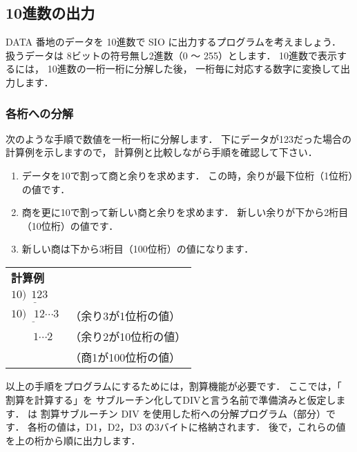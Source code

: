 \subsection{10進数の出力}

DATA 番地のデータを 10進数で SIO に出力するプログラムを考えましょう．
扱うデータは 8ビットの符号無し2進数（0 〜 255）とします．
10進数で表示するには， 
10進数の一桁一桁に分解した後，
一桁毎に対応する数字に変換して出力します．

\subsubsection{各桁への分解}
次のような手順で数値を一桁一桁に分解します．
下にデータが123だった場合の計算例を示しますので，
計算例と比較しながら手順を確認して下さい．

\begin{enumerate}
\item データを10で割って商と余りを求めます．
この時，余りが最下位桁（1位桁）の値です．

\item 商を更に10で割って新しい商と余りを求めます．
新しい余りが下から2桁目（10位桁）の値です．

\item 新しい商は下から3桁目（100位桁）の値になります．
\end{enumerate}

\begin{center}
\begin{tabular}{l l}
{\bf 計算例} & \\
$10 \underline{) ~~123 } $ & \\
$10 \underline{) ~~~12 } {\cdots 3}$ & （余り3が1位桁の値）\\
$~~  ~~~~~~~1 {\cdots 2}$            & （余り2が10位桁の値） \\
                                     & （商1が100位桁の値）
\end{tabular}
\end{center}

以上の手順をプログラムにするためには，割算機能が必要です．
ここでは，「 割算を計算する」を
サブルーチン化してDIVと言う名前で準備済みと仮定します．
は
割算サブルーチン DIV を使用した桁への分解プログラム（部分）です．
各桁の値は，D1，D2，D3 の3バイトに格納されます．
後で，これらの値を上の桁から順に出力します．

